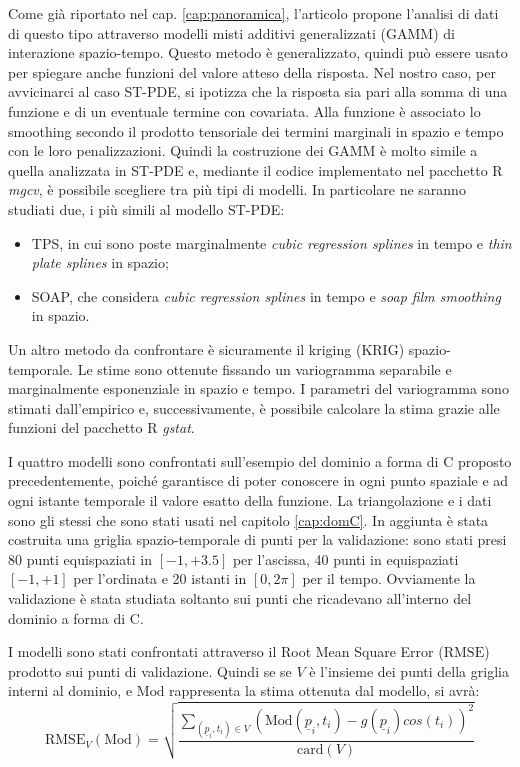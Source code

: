 \documentclass[a4paper,11pt,twoside,openright]{book}							%
\begin{document}
Come già riportato nel cap. \ref{cap:panoramica}, l'articolo \cite{art:augustin} propone l'analisi di dati di questo tipo attraverso modelli misti additivi generalizzati (GAMM) di interazione spazio-tempo. Questo metodo è generalizzato, quindi può essere usato per spiegare anche funzioni del valore atteso della risposta. Nel nostro caso, per avvicinarci al caso ST-PDE, si ipotizza che la risposta sia pari alla somma di una funzione e di un eventuale termine con covariata. Alla funzione è associato lo smoothing secondo il prodotto tensoriale dei termini marginali in spazio e tempo con le loro penalizzazioni. Quindi la costruzione dei GAMM è molto simile a quella analizzata in ST-PDE e, mediante il codice implementato nel pacchetto R \textit{mgcv}, è possibile scegliere tra più tipi di modelli. In particolare ne saranno studiati due, i più simili al modello ST-PDE:
\begin{itemize}
\item TPS, in cui sono poste marginalmente \textit{cubic regression splines} in tempo e \textit{thin plate splines} in spazio;
\item SOAP, che considera \textit{cubic regression splines} in tempo e \textit{soap film smoothing} in spazio.
\end{itemize}

Un altro metodo da confrontare è sicuramente il kriging (KRIG) spazio-temporale. Le stime sono ottenute fissando un variogramma separabile e marginalmente esponenziale in spazio e tempo. I parametri del variogramma sono stimati dall'empirico e, successivamente, è possibile calcolare la stima grazie alle funzioni del pacchetto R \textit{gstat}. 

I quattro modelli sono confrontati sull'esempio del dominio a forma di C proposto precedentemente, poiché garantisce di poter conoscere in ogni punto spaziale e ad ogni istante temporale il valore esatto della funzione. La triangolazione e i dati sono gli stessi che sono stati usati nel capitolo \ref{cap:domC}. In aggiunta è stata costruita una griglia spazio-temporale di punti per la validazione: sono stati presi 80 punti equispaziati in $[-1,+3.5]$ per l'ascissa, 40 punti in equispaziati $[-1,+1]$ per l'ordinata e 20 istanti in $[0,2\pi]$ per il tempo. Ovviamente la validazione è stata studiata soltanto sui punti che ricadevano all'interno del dominio a forma di C.

I modelli sono stati confrontati attraverso il Root Mean Square Error ($\mathrm{RMSE}$) prodotto sui punti di validazione. Quindi se se $V$ è l'insieme dei punti della griglia interni al dominio, e $\mathrm{Mod}$ rappresenta la stima ottenuta dal modello, si avrà:
$$
\mathrm{RMSE}_V(\mathrm{Mod})=\sqrt{\frac{\sum_{(\underline p_i,t_i)\in V} (\mathrm{Mod}(\underline p_i,t_i)-g(\underline p_i)cos(t_i))^2}{\mathrm{card}(V)}}
$$ 
\end{document}

